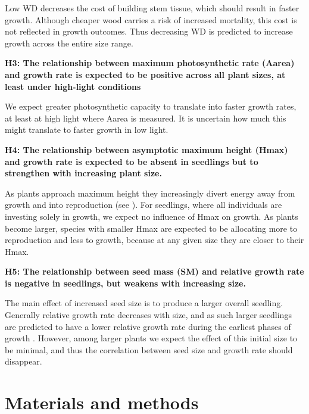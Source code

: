 \documentclass[a4paper]{article}\usepackage[]{graphicx}\usepackage[]{color}
\begin{document}
Low WD decreases the cost of building stem tissue, which should result in faster growth. Although cheaper wood carries a risk of increased mortality, this cost is not reflected in growth outcomes. Thus decreasing WD is predicted to increase growth across the entire size range. 

\textbf{H3: The relationship between maximum photosynthetic rate (Aarea) and growth rate is expected to be positive across all plant sizes, at least under high-light conditions}

We expect greater photosynthetic capacity to translate into faster growth rates, at least at high light where Aarea is measured. It is uncertain how much this might translate to faster growth in low light. 

\textbf{H4: The relationship between asymptotic maximum height (Hmax) and growth rate is expected to be absent in seedlings but to strengthen with increasing plant size.}

As plants approach maximum height they increasingly divert energy away from growth and into reproduction (see \citealt{Thomas:1996do, Falster:2011ii, Wenk:2014jz}). For seedlings, where all individuals are investing solely in growth, we expect no influence of Hmax on growth. As plants become larger, species with smaller Hmax are expected to be allocating more to reproduction and less to growth, because at any given size they are closer to their Hmax. 

\textbf{H5: The relationship between seed mass (SM) and relative growth rate is negative in seedlings, but weakens with increasing size.}

The main effect of increased seed size is to produce a larger overall seedling. Generally relative growth rate decreases with size, and as such larger seedlings are predicted to have a lower relative growth rate during the earliest phases of growth \citet{Turnbull:2012ew}. However, among larger plants we expect the effect of this initial size to be minimal, and thus the correlation between seed size and growth rate should disappear.

\section*{Materials and methods}\label{material-and-methods}
\end{document}

